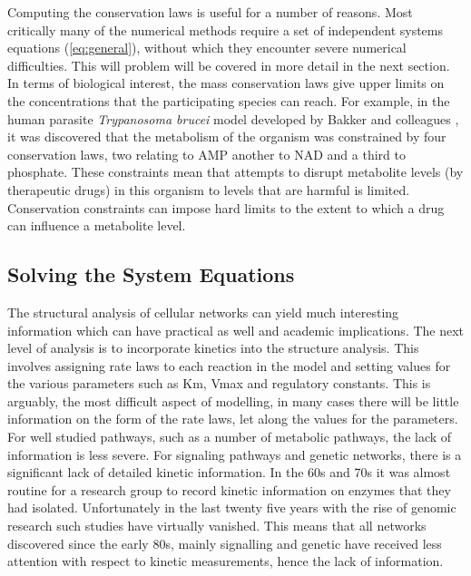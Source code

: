 Computing the conservation laws is useful for a number of reasons.
Most critically many of the numerical methods require a set of
independent systems equations (\ref{eq:general}), without which
they encounter severe numerical difficulties. This will problem
will be covered in more detail in the next section. In terms of
biological interest, the mass conservation laws give upper limits
on the concentrations that the participating species can reach.
For example, in the human parasite {\em Trypanosoma brucei} model
developed by Bakker and colleagues \cite{Bakker:1997}, it was
discovered that the metabolism of the organism was constrained by
four conservation laws, two relating to AMP another to NAD and a
third to phosphate. These constraints mean that attempts to
disrupt metabolite levels (by therapeutic drugs) in this organism
to levels that are harmful is limited. Conservation constraints
can impose hard limits to the extent to which a drug can influence
a metabolite level.


\subsection{Solving the System Equations}

The structural analysis of cellular networks can yield much
interesting information which can have practical as well and
academic implications. The next level of analysis is to
incorporate kinetics into the structure analysis. This involves
assigning rate laws to each reaction in the model and setting
values for the various parameters such as Km, Vmax and regulatory
constants. This is arguably, the most difficult aspect of
modelling, in many cases there will be little information on the
form of the rate laws, let along the values for the parameters.
For well studied pathways, such as a number of metabolic pathways,
the lack of information is less severe. For signaling pathways and
genetic networks, there is a significant lack of detailed kinetic
information. In the 60s and 70s it was almost routine for a
research group to record kinetic information on enzymes that they
had isolated. Unfortunately in the last twenty five years with the
rise of genomic research such studies have virtually vanished.
This means that all networks discovered since the early 80s,
mainly signalling and genetic have received less attention with
respect to kinetic measurements, hence the lack of information.


